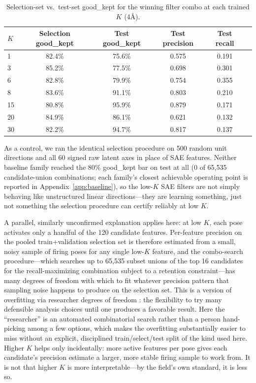 \documentclass{article}
\begin{document}
\begin{table}[!ht]
\caption{Selection-set vs.\ test-set good\_kept for the winning filter combo at each trained $K$ (4\r{A}).}
\label{tab:generalize}
\centering
\begin{small}
\begin{tabular}{lccccc}
\toprule
$K$ & Selection good\_kept & Test good\_kept & Test precision & Test recall \\
\midrule
1  & 82.4\% & 75.6\% & 0.575 & 0.191 \\
3  & 85.2\% & 77.5\% & 0.698 & 0.301 \\
6  & 82.8\% & 79.9\% & 0.754 & 0.355 \\
8  & 83.6\% & 91.1\% & 0.803 & 0.210 \\
15 & 80.8\% & 95.9\% & 0.879 & 0.171 \\
20 & 84.9\% & 86.1\% & 0.621 & 0.132 \\
30 & 82.2\% & 94.7\% & 0.817 & 0.137 \\
\bottomrule
\end{tabular}
\end{small}
\end{table}

As a control, we ran the identical selection procedure on 500 random unit directions and all 60 signed raw latent axes in place of SAE features. Neither baseline family reached the 80\% good\_kept bar on test at all (0 of 65{,}535 candidate-union combinations; each family's closest achievable operating point is reported in Appendix~\ref{app:baseline}), so the low-$K$ SAE filters are not simply behaving like unstructured linear directions---they are learning something, just not something the selection procedure can certify reliably at low $K$.

A parallel, similarly unconfirmed explanation applies here: at low $K$, each pose activates only a handful of the 120 candidate features. Per-feature precision on the pooled train+validation selection set is therefore estimated from a small, noisy sample of firing poses for any single low-$K$ feature, and the combo-search procedure---which searches up to 65{,}535 subset unions of the top 16 candidates for the recall-maximizing combination subject to a retention constraint---has many degrees of freedom with which to fit whatever precision pattern that sampling noise happens to produce on the selection set. This is a version of overfitting via researcher degrees of freedom \citep{simmons2011}: the flexibility to try many defensible analysis choices until one produces a favorable result. Here the ``researcher'' is an automated combinatorial search rather than a person hand-picking among a few options, which makes the overfitting substantially easier to miss without an explicit, disciplined train/select/test split of the kind used here. Higher $K$ helps only incidentally: more active features per pose gives each candidate's precision estimate a larger, more stable firing sample to work from. It is not that higher $K$ is more interpretable---by the field's own standard, it is less so.
\end{document}
